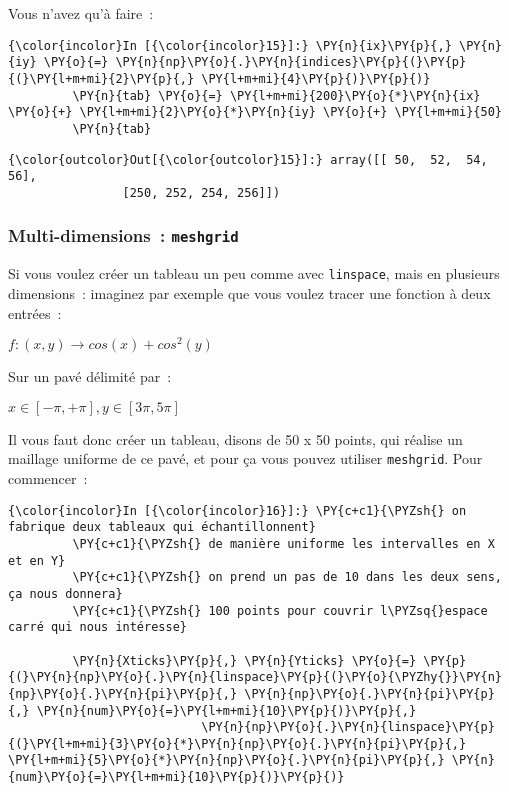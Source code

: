 Vous n'avez qu'à faire~:

    \begin{Verbatim}[commandchars=\\\{\},frame=single,framerule=0.3mm,rulecolor=\color{cellframecolor}]
{\color{incolor}In [{\color{incolor}15}]:} \PY{n}{ix}\PY{p}{,} \PY{n}{iy} \PY{o}{=} \PY{n}{np}\PY{o}{.}\PY{n}{indices}\PY{p}{(}\PY{p}{(}\PY{l+m+mi}{2}\PY{p}{,} \PY{l+m+mi}{4}\PY{p}{)}\PY{p}{)}
         \PY{n}{tab} \PY{o}{=} \PY{l+m+mi}{200}\PY{o}{*}\PY{n}{ix} \PY{o}{+} \PY{l+m+mi}{2}\PY{o}{*}\PY{n}{iy} \PY{o}{+} \PY{l+m+mi}{50}
         \PY{n}{tab}
\end{Verbatim}


\begin{Verbatim}[commandchars=\\\{\},frame=single,framerule=0.3mm,rulecolor=\color{cellframecolor}]
{\color{outcolor}Out[{\color{outcolor}15}]:} array([[ 50,  52,  54,  56],
                [250, 252, 254, 256]])
\end{Verbatim}
            
    \hypertarget{multi-dimensions-meshgrid}{%
\subsubsection{\texorpdfstring{Multi-dimensions~:
\texttt{meshgrid}}{Multi-dimensions~: meshgrid}}\label{multi-dimensions-meshgrid}}

    Si vous voulez créer un tableau un peu comme avec \texttt{linspace},
mais en plusieurs dimensions~: imaginez par exemple que vous voulez
tracer une fonction à deux entrées~:

\(f : (x, y) \longrightarrow cos(x) + cos^2(y)\)

Sur un pavé délimité par~:

\(x \in [-\pi, +\pi], y \in [3\pi, 5\pi]\)

    Il vous faut donc créer un tableau, disons de 50 x 50 points, qui
réalise un maillage uniforme de ce pavé, et pour ça vous pouvez utiliser
\texttt{meshgrid}. Pour commencer~:

    \begin{Verbatim}[commandchars=\\\{\},frame=single,framerule=0.3mm,rulecolor=\color{cellframecolor}]
{\color{incolor}In [{\color{incolor}16}]:} \PY{c+c1}{\PYZsh{} on fabrique deux tableaux qui échantillonnent}
         \PY{c+c1}{\PYZsh{} de manière uniforme les intervalles en X et en Y}
         \PY{c+c1}{\PYZsh{} on prend un pas de 10 dans les deux sens, ça nous donnera}
         \PY{c+c1}{\PYZsh{} 100 points pour couvrir l\PYZsq{}espace carré qui nous intéresse}
         
         \PY{n}{Xticks}\PY{p}{,} \PY{n}{Yticks} \PY{o}{=} \PY{p}{(}\PY{n}{np}\PY{o}{.}\PY{n}{linspace}\PY{p}{(}\PY{o}{\PYZhy{}}\PY{n}{np}\PY{o}{.}\PY{n}{pi}\PY{p}{,} \PY{n}{np}\PY{o}{.}\PY{n}{pi}\PY{p}{,} \PY{n}{num}\PY{o}{=}\PY{l+m+mi}{10}\PY{p}{)}\PY{p}{,}
                           \PY{n}{np}\PY{o}{.}\PY{n}{linspace}\PY{p}{(}\PY{l+m+mi}{3}\PY{o}{*}\PY{n}{np}\PY{o}{.}\PY{n}{pi}\PY{p}{,} \PY{l+m+mi}{5}\PY{o}{*}\PY{n}{np}\PY{o}{.}\PY{n}{pi}\PY{p}{,} \PY{n}{num}\PY{o}{=}\PY{l+m+mi}{10}\PY{p}{)}\PY{p}{)}
\end{Verbatim}


